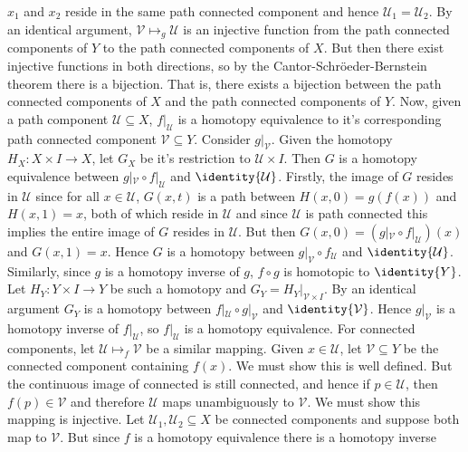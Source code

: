 \documentclass{book}                                                           %
\begin{document}
\begin{solution}
    $x_{1}$ and $x_{2}$ reside in the same path connected component and
    hence $\mathcal{U}_{1}=\mathcal{U}_{2}$. By an identical argument,
    $\mathcal{V}\mapsto_{g}\mathcal{U}$ is an injective function from the
    path connected components of $Y$ to the path connected components of
    $X$. But then there exist injective functions in both directions, so by
    the Cantor-Schr\"{o}eder-Bernstein theorem there is a bijection. That
    is, there exists a bijection between the path connected components
    of $X$ and the path connected components of $Y$. Now, given a path
    component $\mathcal{U}\subseteq{X}$, $f|_{\mathcal{U}}$ is a homotopy
    equivalence to it's corresponding path connected component
    $\mathcal{V}\subseteq{Y}$. Consider $g|_{\mathcal{V}}$. Given the
    homotopy $H_{X}:X\times{I}\rightarrow{X}$, let $G_{X}$ be it's
    restriction to $\mathcal{U}\times{I}$. Then $G$ is a homotopy
    equivalence between $g|_{\mathcal{V}}\circ{f}|_{\mathcal{U}}$ and
    $\identity{\mathcal{U}}$. Firstly, the image of $G$ resides in
    $\mathcal{U}$ since for all $x\in\mathcal{U}$, $G(x,t)$ is a path
    between $H(x,0)=g(f(x))$ and $H(x,1)=x$, both of which reside in
    $\mathcal{U}$ and since $\mathcal{U}$ is path connected this implies the
    entire image of $G$ resides in $\mathcal{U}$. But then
    $G(x,0)=(g|_{\mathcal{V}}\circ{f}|_{\mathcal{U}})(x)$ and $G(x,1)=x$.
    Hence $G$ is a homotopy between $g|_{\mathcal{V}}\circ{f}_{\mathcal{U}}$
    and $\identity{\mathcal{U}}$. Similarly, since $g$ is a homotopy inverse
    of $g$, $f\circ{g}$ is homotopic to $\identity{Y}$. Let
    $H_{Y}:Y\times{I}\rightarrow{Y}$ be such a homotopy and
    $G_{Y}=H_{Y}|_{\mathcal{V}\times{I}}$. By an identical argument $G_{Y}$
    is a homotopy between $f|_{\mathcal{U}}\circ{g}|_{\mathcal{V}}$ and
    $\identity{\mathcal{V}}$. Hence $g|_{\mathcal{V}}$ is a homotopy inverse
    of $f|_{\mathcal{U}}$, so $f|_{\mathcal{U}}$ is a homotopy equivalence.
    For connected components, let $\mathcal{U}\mapsto_{f}\mathcal{V}$ be a
    similar mapping. Given $x\in\mathcal{U}$, let $\mathcal{V}\subseteq{Y}$
    be the connected component containing $f(x)$. We must show this is well
    defined. But the continuous image of connected is still connected, and
    hence if $p\in\mathcal{U}$, then $f(p)\in\mathcal{V}$ and therefore
    $\mathcal{U}$ maps unambiguously to $\mathcal{V}$. We must show this
    mapping is injective. Let $\mathcal{U}_{1},\mathcal{U}_{2}\subseteq{X}$
    be connected components and suppose both map to $\mathcal{V}$. But since
    $f$ is a homotopy equivalence there is a homotopy inverse

\end{solution}
\end{document}
